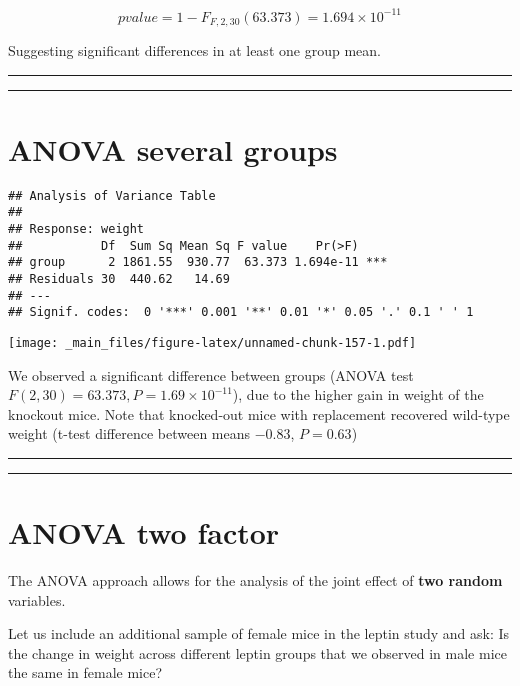 \documentclass[
]{book}
\begin{document}
\[pvalue=1-F_{F,2,30}(63.373)=1.694 \times 10^{-11}\]

Suggesting significant differences in at least one group mean.

\begin{center}\rule{0.5\linewidth}{0.5pt}\end{center}

\begin{center}\rule{0.5\linewidth}{0.5pt}\end{center}

\hypertarget{anova-several-groups-4}{%
\section{ANOVA several groups}\label{anova-several-groups-4}}

\begin{verbatim}
## Analysis of Variance Table
## 
## Response: weight
##           Df  Sum Sq Mean Sq F value    Pr(>F)    
## group      2 1861.55  930.77  63.373 1.694e-11 ***
## Residuals 30  440.62   14.69                      
## ---
## Signif. codes:  0 '***' 0.001 '**' 0.01 '*' 0.05 '.' 0.1 ' ' 1
\end{verbatim}

\texttt{[image: \_main\_files/figure-latex/unnamed-chunk-157-1.pdf]}

We observed a significant difference between groups (ANOVA test \(F(2,30)=63.373, P= 1.69 \times 10^{-11}\)), due to the higher gain in weight of the knockout mice. Note that knocked-out mice with replacement recovered wild-type weight (t-test difference between means \(-0.83\), \(P=0.63\))

\begin{center}\rule{0.5\linewidth}{0.5pt}\end{center}

\begin{center}\rule{0.5\linewidth}{0.5pt}\end{center}

\hypertarget{anova-two-factor}{%
\section{ANOVA two factor}\label{anova-two-factor}}

The ANOVA approach allows for the analysis of the joint effect of \textbf{two random} variables.

Let us include an additional sample of female mice in the leptin study and ask: Is the change in weight across different leptin groups that we observed in male mice the same in female mice?
\end{document}
